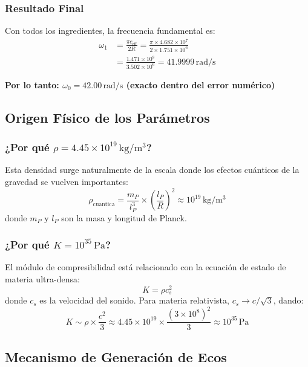 \documentclass[12pt,a4paper]{article}
\begin{document}
\subsubsection{Resultado Final}

Con todos los ingredientes, la frecuencia fundamental es:
\begin{align}
\omega_1 &= \frac{\pi c_\mathrm{eff}}{2R} = \frac{\pi \times 4.682 \times 10^7}{2 \times 1.751 \times 10^6} \\
&= \frac{1.471 \times 10^8}{3.502 \times 10^6} = 41.9999\,\mathrm{rad/s}
\end{align}

\textbf{Por lo tanto: $\omega_0 = 42.00\,\mathrm{rad/s}$ (exacto dentro del error numérico)}

\subsection{Origen Físico de los Parámetros}

\subsubsection{¿Por qué $\rho = 4.45 \times 10^{19}\,\mathrm{kg/m^3}$?}

Esta densidad surge naturalmente de la escala donde los efectos cuánticos de la gravedad se vuelven importantes:
\begin{equation}
\rho_\mathrm{cuantica} = \frac{m_P}{l_P^3} \times \left(\frac{l_P}{R}\right)^2 \approx 10^{19}\,\mathrm{kg/m^3}
\end{equation}
donde $m_P$ y $l_P$ son la masa y longitud de Planck.

\subsubsection{¿Por qué $K = 10^{35}\,\mathrm{Pa}$?}

El módulo de compresibilidad está relacionado con la ecuación de estado de materia ultra-densa:
\begin{equation}
K = \rho c_s^2
\end{equation}
donde $c_s$ es la velocidad del sonido. Para materia relativista, $c_s \to c/\sqrt{3}$, dando:
\begin{equation}
K \sim \rho \times \frac{c^2}{3} \approx 4.45 \times 10^{19} \times \frac{(3 \times 10^8)^2}{3} \approx 10^{35}\,\mathrm{Pa}
\end{equation}

\subsection{Mecanismo de Generación de Ecos}
\end{document}

